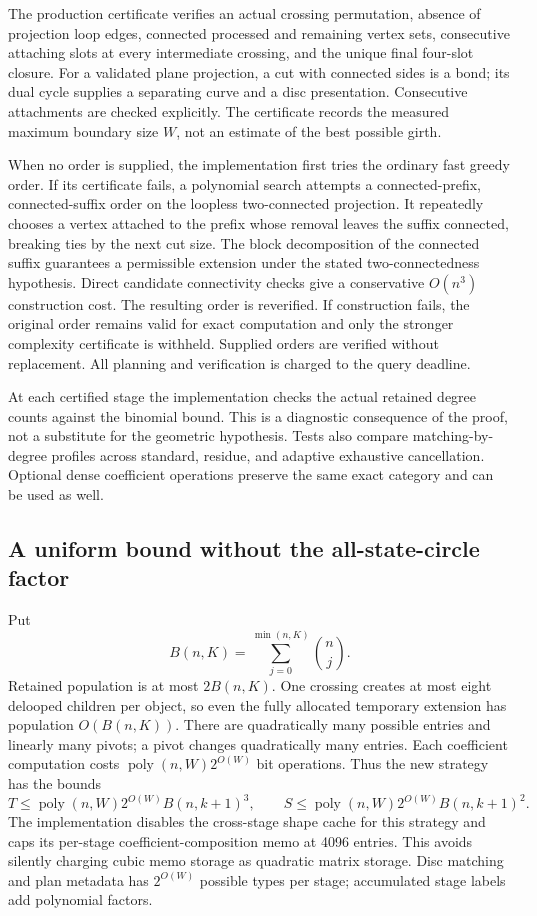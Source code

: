 The production certificate verifies an actual crossing permutation,
absence of projection loop edges, connected processed and remaining
vertex sets, consecutive attaching slots at every intermediate crossing,
and the unique final four-slot closure. For a validated plane projection,
a cut with connected sides is a bond; its dual cycle supplies a separating
curve and a disc presentation. Consecutive attachments are checked
explicitly. The certificate records the measured maximum boundary size
$W$, not an estimate of the best possible girth.

When no order is supplied, the implementation first tries the ordinary
fast greedy order. If its certificate fails, a polynomial search attempts
a connected-prefix, connected-suffix order on the loopless two-connected
projection. It repeatedly chooses a vertex attached to the prefix whose
removal leaves the suffix connected, breaking ties by the next cut size.
The block decomposition of the connected suffix guarantees a permissible
extension under the stated two-connectedness hypothesis. Direct candidate
connectivity checks give a conservative $O(n^3)$ construction cost.
The resulting order is reverified. If construction fails, the original
order remains valid for exact computation and only the stronger complexity
certificate is withheld. Supplied orders are verified without replacement.
All planning and verification is charged to the query deadline.

At each certified stage the implementation checks the actual retained
degree counts against the binomial bound. This is a diagnostic consequence
of the proof, not a substitute for the geometric hypothesis. Tests also
compare matching-by-degree profiles across standard, residue, and adaptive
exhaustive cancellation. Optional dense coefficient operations preserve
the same exact category and can be used as well.

\subsection{A uniform bound without the all-state-circle factor}
Put
\[
 B(n,K)=\sum_{j=0}^{\min(n,K)}\binom nj.
\]
Retained population is at most $2B(n,K)$. One crossing creates at most
eight delooped children per object, so even the fully allocated temporary
extension has population $O(B(n,K))$. There are quadratically many
possible entries and linearly many pivots; a pivot changes quadratically
many entries. Each coefficient computation costs
$\operatorname{poly}(n,W)2^{O(W)}$ bit operations. Thus the new strategy
has the bounds
\[
 T\le\operatorname{poly}(n,W)2^{O(W)}B(n,k+1)^3,
 \qquad
 S\le\operatorname{poly}(n,W)2^{O(W)}B(n,k+1)^2.
\]
The implementation disables the cross-stage shape cache for this strategy
and caps its per-stage coefficient-composition memo at 4096 entries.
This avoids silently charging cubic memo storage as quadratic matrix
storage. Disc matching and plan metadata has $2^{O(W)}$ possible types
per stage; accumulated stage labels add polynomial factors.

